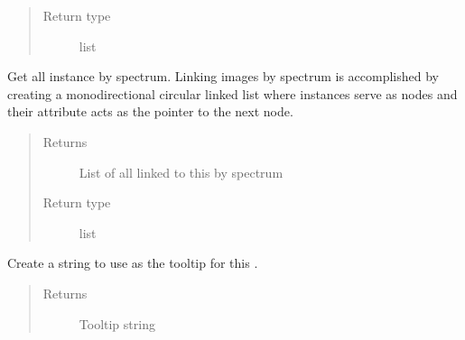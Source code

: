 \documentclass[letterpaper,10pt,english]{sphinxmanual}
\begin{document}
\begin{fulllineitems}
\begin{fulllineitems}
\begin{quote}
\begin{description}
\item[{Return type}] \leavevmode
list

\end{description}\end{quote}

\end{fulllineitems}


\begin{fulllineitems}
\label{\detokenize{polo.crystallography:polo.crystallography.image.Image.get_linked_images_by_spectrum}}
Get all  instance by
spectrum. Linking images by spectrum is accomplished by
creating a mono\sphinxhyphen{}directional circular linked list where
{\hyperref[\detokenize{polo.crystallography:polo.crystallography.image.Image}]{}} instances serve as nodes and their 
 attribute
acts as the pointer to the next node.
\begin{quote}\begin{description}
\item[{Returns}] \leavevmode
List of all  linked to this
{\hyperref[\detokenize{polo.crystallography:polo.crystallography.image.Image}]{}} by spectrum

\item[{Return type}] \leavevmode
list

\end{description}\end{quote}

\end{fulllineitems}


\begin{fulllineitems}
\label{\detokenize{polo.crystallography:polo.crystallography.image.Image.get_tool_tip}}
Create a string to use as the tooltip for this
{\hyperref[\detokenize{polo.crystallography:polo.crystallography.image.Image}]{}}.
\begin{quote}\begin{description}
\item[{Returns}] \leavevmode
Tooltip string


\end{description}
\end{quote}
\end{fulllineitems}
\end{fulllineitems}
\end{document}
